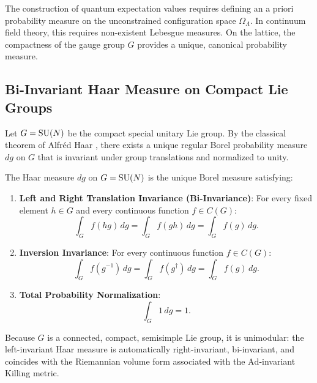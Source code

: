 The construction of quantum expectation values requires defining an a priori probability measure on the unconstrained configuration space $\Omega_\Lambda$. In continuum field theory, this requires non-existent Lebesgue measures. On the lattice, the compactness of the gauge group $G$ provides a unique, canonical probability measure.

\subsection{Bi-Invariant Haar Measure on Compact Lie Groups}
\label{subsec:haar_measure_properties}
Let $G = \mathrm{SU}(N)$ be the compact special unitary Lie group. By the classical theorem of Alfr\'ed Haar \cite{StreaterWightman1964}, there exists a unique regular Borel probability measure $dg$ on $G$ that is invariant under group translations and normalized to unity.
\begin{theorem}
\label{thm:haar_measure_properties}
The Haar measure $dg$ on $G = \mathrm{SU}(N)$ is the unique Borel measure satisfying:
\begin{enumerate}
    \item \textbf{Left and Right Translation Invariance (Bi-Invariance)}: For every fixed element $h \in G$ and every continuous function $f \in C(G)$:
    \begin{equation}
    \int_G f(h g) \, dg = \int_G f(g h) \, dg = \int_G f(g) \, dg.
    \end{equation}
    \item \textbf{Inversion Invariance}: For every continuous function $f \in C(G)$:
    \begin{equation}
    \int_G f(g^{-1}) \, dg = \int_G f(g^\dagger) \, dg = \int_G f(g) \, dg.
    \end{equation}
    \item \textbf{Total Probability Normalization}:
    \begin{equation}
    \int_G 1 \, dg = 1.
    \end{equation}
\end{enumerate}
\end{theorem}
Because $G$ is a connected, compact, semisimple Lie group, it is unimodular: the left-invariant Haar measure is automatically right-invariant, bi-invariant, and coincides with the Riemannian volume form associated with the $\mathrm{Ad}$-invariant Killing metric.

